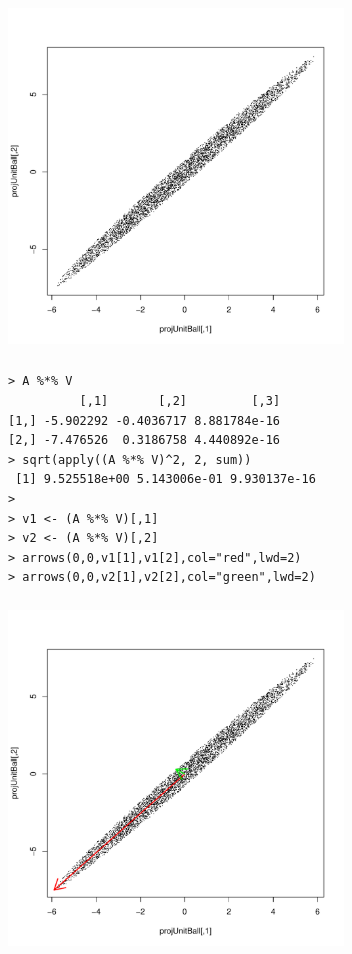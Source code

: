 \begin{frame}[fragile] \frametitle{}

\begin{center}
\includegraphics[width=3.5in]{img/fig04.pdf}
\end{center}

\end{frame}

\begin{frame}[fragile] \frametitle{}

\begin{verbatim}
> A %*% V
          [,1]       [,2]         [,3]
[1,] -5.902292 -0.4036717 8.881784e-16
[2,] -7.476526  0.3186758 4.440892e-16
> sqrt(apply((A %*% V)^2, 2, sum))
 [1] 9.525518e+00 5.143006e-01 9.930137e-16
>
> v1 <- (A %*% V)[,1]
> v2 <- (A %*% V)[,2]
> arrows(0,0,v1[1],v1[2],col="red",lwd=2)
> arrows(0,0,v2[1],v2[2],col="green",lwd=2)
\end{verbatim}

\end{frame}

\begin{frame}[fragile] \frametitle{}

\begin{center}
\includegraphics[width=3.5in]{img/fig05.pdf}
\end{center}

\end{frame}

